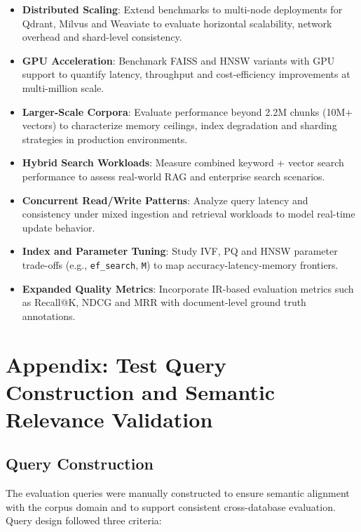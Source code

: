 \documentclass{article}
\begin{document}
\begin{itemize}
  \item \textbf{Distributed Scaling}: Extend benchmarks to multi-node deployments for Qdrant, Milvus and Weaviate to evaluate horizontal scalability, network overhead and shard-level consistency.
  
  \item \textbf{GPU Acceleration}: Benchmark FAISS and HNSW variants with GPU support to quantify latency, throughput and cost-efficiency improvements at multi-million scale.
  
  \item \textbf{Larger-Scale Corpora}: Evaluate performance beyond 2.2M chunks (10M+ vectors) to characterize memory ceilings, index degradation and sharding strategies in production environments.
  
  \item \textbf{Hybrid Search Workloads}: Measure combined keyword + vector search performance to assess real-world RAG and enterprise search scenarios.
  
  \item \textbf{Concurrent Read/Write Patterns}: Analyze query latency and consistency under mixed ingestion and retrieval workloads to model real-time update behavior.
  
  \item \textbf{Index and Parameter Tuning}: Study IVF, PQ and HNSW parameter trade-offs (e.g., \texttt{ef\_search}, \texttt{M}) to map accuracy-latency-memory frontiers.
  
  \item \textbf{Expanded Quality Metrics}: Incorporate IR-based evaluation metrics such as Recall@K, NDCG and MRR with document-level ground truth annotations.
\end{itemize}


\section{Appendix: Test Query Construction and Semantic Relevance Validation}
\label{sec: appendix}

\subsection{Query Construction}
The evaluation queries were manually constructed to ensure semantic alignment with the corpus domain and to support consistent cross-database evaluation. Query design followed three criteria:
\end{document}
